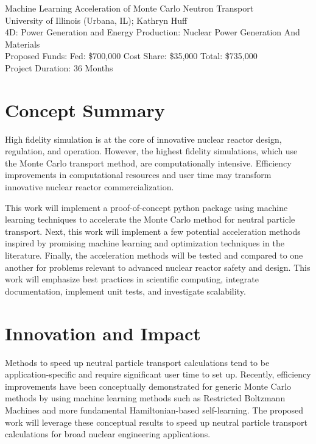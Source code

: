 \documentclass[letterpaper,12pt]{article}
\date{}
\newcommand*\fourteenpt{\fontsize{14}{15.5}\selectfont}
\begin{document}
\thispagestyle{fancy}
\begin{center}
{\fourteenpt Machine Learning Acceleration of Monte Carlo Neutron Transport}\\
\vspace{3mm}
University of Illinois (Urbana, IL); Kathryn Huff\\
\vspace{3mm}
4D: Power Generation and Energy Production: Nuclear Power Generation And Materials\\
Proposed Funds: Fed: \$700,000\/ Cost Share: \$35,000\/ Total: \$735,000\\
Project Duration: 36 Months\\
\end{center}

\section{Concept Summary}

High fidelity simulation is at the core of innovative nuclear reactor design,
regulation, and operation. However, the highest fidelity simulations,
which use the Monte Carlo transport method, are computationally intensive.
Efficiency improvements in computational resources and user time may transform
innovative nuclear reactor commercialization.

This work will implement a proof-of-concept python package using machine 
learning techniques to accelerate the Monte Carlo method for neutral particle transport.
Next, this work will implement a few potential acceleration methods inspired 
by promising machine learning and optimization techniques in the literature.
Finally, the acceleration methods will be tested and compared to one another for
problems relevant to advanced nuclear reactor safety and design.
This work will emphasize best practices in
scientific computing, integrate documentation, implement unit
tests, and investigate scalability. 

\section{Innovation and Impact}
Methods to speed up neutral particle transport calculations tend to be 
application-specific and require significant user time to set up. Recently, 
efficiency improvements have been conceptually demonstrated for generic Monte 
Carlo methods by using machine learning methods such as Restricted Boltzmann 
Machines\cite{huang_accelerated_2017} and more fundamental Hamiltonian-based 
self-learning\cite{liu_self-learning_2017}. The proposed work will leverage 
these conceptual results to speed up neutral particle transport calculations 
for broad nuclear engineering applications. 
\FloatBarrier
\end{document}
